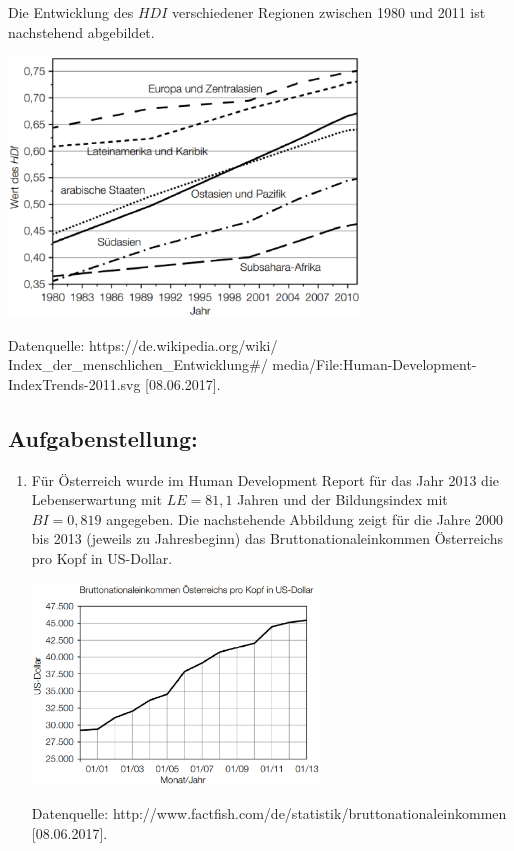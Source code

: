 \begin{langesbeispiel}
Die Entwicklung des $HDI$ verschiedener Regionen zwischen 1980 und 2011 ist nachstehend abgebildet.

\begin{center}
\includegraphics[width=0.7\textwidth]{../_database/Bilder/Bild86-1.eps}
\end{center}
\begin{singlespace}
\tiny Datenquelle: https://de.wikipedia.org/wiki/
Index\_der\_menschlichen\_Entwicklung\#/
media/File:Human-Development-IndexTrends-2011.svg
[08.06.2017]. \normalsize
\end{singlespace}

\subsection{Aufgabenstellung:}

\begin{enumerate}
	\item Für Österreich wurde im Human Development Report für das Jahr 2013 die Lebenserwartung mit $LE = 81,1$ Jahren und der Bildungsindex mit $BI = 0,819$ angegeben. Die nachstehende Abbildung zeigt für die Jahre 2000 bis 2013 (jeweils zu Jahresbeginn) das Bruttonationaleinkommen Österreichs pro Kopf in US-Dollar.
	
\begin{center}
\includegraphics[width=0.6\textwidth]{../_database/Bilder/Bild86-2.eps}
\end{center}	
\tiny Datenquelle: http://www.factfish.com/de/statistik/bruttonationaleinkommen [08.06.2017]. \normalsize


\end{enumerate}
\end{langesbeispiel}
